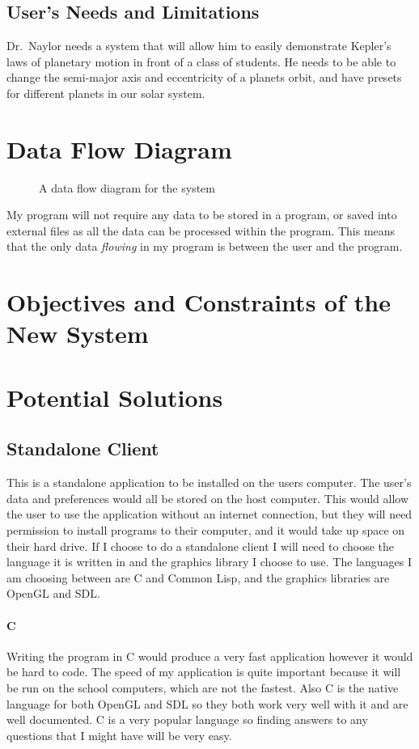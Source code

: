 \subsection{User's Needs and Limitations} 
Dr.~Naylor needs a system that will allow him to easily demonstrate Kepler's
laws of planetary motion in front of a class of students. He needs to be able
to change the semi-major axis and eccentricity of a planets orbit, and have
presets for different planets in our solar system. 

\section{Data Flow Diagram}
\begin{figure}[h]
	\centerline{}
	\caption{A data flow diagram for the system}
	\label{fig:dfd}
\end{figure}
My program will not require any data to be stored in a program, or saved into
external files as all the data can be processed within the program. This means
that the only data \emph{flowing} in my program is between the user and the
program. 

\section{Objectives and Constraints of the New System}


\section{Potential Solutions}

\subsection{Standalone Client}
This is a standalone application to be installed on the users computer. The
user's data and preferences would all be stored on the host computer. This would
allow the user to use the application without an internet connection, but they
will need permission to install programs to their computer, and it would take up
space on their hard drive. If I choose to do a standalone client I will need to
choose the language it is written in and the graphics library I choose to use.
The languages I am choosing between are C and Common Lisp, and the graphics
libraries are OpenGL and SDL.

\paragraph{C}
Writing the program in C would produce a very fast application however it would
be hard to code. The speed of my application is quite important because it will
be run on the school computers, which are not the fastest. Also C is the native
language for both OpenGL and SDL so they both work very well with it and are
well documented. C is a very popular language so finding answers to any
questions that I might have will be very easy.

